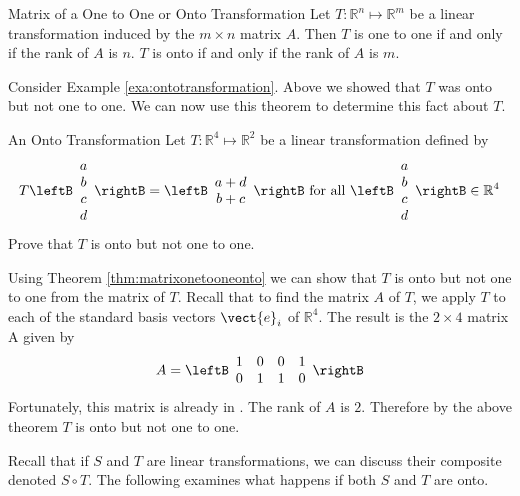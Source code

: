 \begin{theorem}{Matrix of a One to One or Onto Transformation}\label{thm:matrixonetooneonto}
Let $T: \mathbb{R}^n \mapsto \mathbb{R}^m$ be a linear transformation induced by the $m \times n$ matrix $A$. Then $T$ is one to one if and only if the rank of $A$ is $n$. $T$ is onto if and only if the rank of $A$ is $m$. 
\end{theorem}

Consider Example \ref{exa:ontotransformation}. Above we showed that $T$ was onto but not one to one. We can now use this theorem to determine this fact about $T$. 

\begin{example}{An Onto Transformation}\label{exa:ontotransformationmatrix}
Let $T: \mathbb{R}^4 \mapsto \mathbb{R}^2$ be a linear transformation defined by
\[
T \leftB \begin{array}{c}
a \\
b \\
c \\
d
\end{array}
\rightB = 
\leftB \begin{array}{c}
a + d \\
b + c 
\end{array}
\rightB
\mbox{ for all } \leftB \begin{array}{c}
a \\
b \\
c \\
d
\end{array}
\rightB \in \mathbb{R}^4
\]
Prove that $T$ is onto but not one to one.
\end{example}

\begin{solution}
Using Theorem \ref{thm:matrixonetooneonto} we can show that $T$ is onto but not one to one from the matrix of $T$. Recall that to find the matrix $A$ of $T$, we apply $T$ to each of the standard basis vectors $\vect{e}_i$ of $\mathbb{R}^4$. The result is the $2 \times 4$ matrix A given by 
\[
A = \leftB \begin{array}{rrrr}
1 & 0 & 0 & 1 \\
0 & 1 & 1 & 0 
\end{array} \rightB
\]
Fortunately, this matrix is already in \rref. The rank of $A$ is $2$. Therefore by the above theorem $T$ is onto but not one to one. 
\end{solution}

Recall that if $S$ and $T$ are linear transformations, we can discuss their composite denoted $S \circ T$. The following examines what happens if both $S$ and $T$ are onto. 

